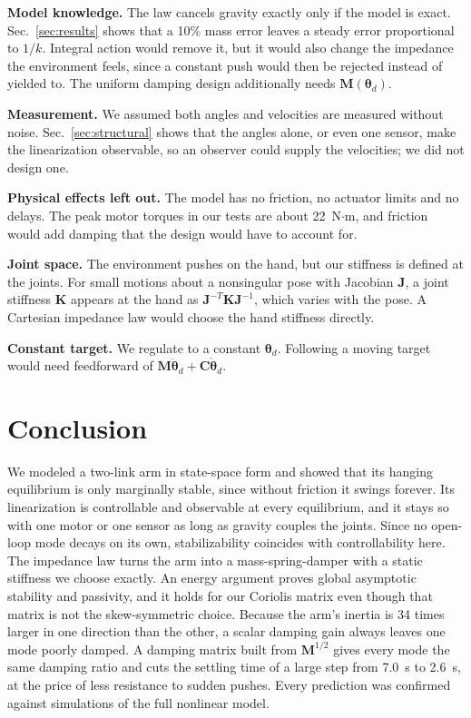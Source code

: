 \documentclass[letterpaper, 10pt, conference]{ieeeconf}
\begin{document}
\textbf{Model knowledge.} The law cancels gravity exactly only
if the model is exact. Sec.~\ref{sec:results} shows that a 10\%
mass error leaves a steady error proportional to $1/k$. Integral
action would remove it, but it would also change the impedance
the environment feels, since a constant push would then be
rejected instead of yielded to. The uniform damping design
additionally needs $\mathbf{M}(\boldsymbol{\theta}_d)$.

\textbf{Measurement.} We assumed both angles and velocities are
measured without noise. Sec.~\ref{sec:structural} shows that the
angles alone, or even one sensor, make the linearization
observable, so an observer could supply the velocities; we did
not design one.

\textbf{Physical effects left out.} The model has no friction,
no actuator limits and no delays. The peak motor torques in our
tests are about 22~N$\cdot$m, and friction would add damping that
the design would have to account for.

\textbf{Joint space.} The environment pushes on the hand, but our
stiffness is defined at the joints. For small motions about a
nonsingular pose with Jacobian $\mathbf{J}$, a joint stiffness
$\mathbf{K}$ appears at the hand as
$\mathbf{J}^{-T}\mathbf{K}\mathbf{J}^{-1}$, which varies with the pose.
A Cartesian impedance law would choose the hand stiffness directly.

\textbf{Constant target.} We regulate to a constant
$\boldsymbol{\theta}_d$. Following a moving target would need
feedforward of $\mathbf{M}\ddot{\boldsymbol{\theta}}_d+
\mathbf{C}\dot{\boldsymbol{\theta}}_d$.

\section{Conclusion}

We modeled a two-link arm in state-space form and showed that
its hanging equilibrium is only marginally stable, since without
friction it swings forever. Its linearization is controllable and
observable at every equilibrium, and it stays so with one motor
or one sensor as long as gravity couples the joints. Since no
open-loop mode decays on its own, stabilizability coincides with
controllability here. The impedance law turns the arm into a
mass-spring-damper with a static stiffness we choose exactly. An
energy argument proves global asymptotic stability and passivity,
and it holds for our Coriolis matrix even though that matrix is
not the skew-symmetric choice. Because the arm's inertia
is 34 times larger in one direction than the other, a scalar
damping gain always leaves one mode poorly damped. A damping
matrix built from $\mathbf{M}^{1/2}$ gives every mode the same
damping ratio and cuts the settling time of a large step from
7.0~s to 2.6~s, at the price of less resistance to sudden pushes.
Every prediction was confirmed against simulations of the full
nonlinear model.



\end{document}
